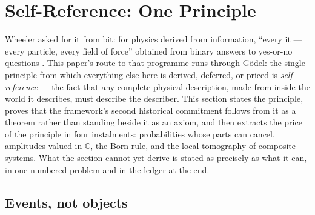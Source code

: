 %

\section{Self-Reference: One Principle}
\label{sec:self-reference-2}

Wheeler asked for it from bit: for physics derived from information, ``every it --- every particle,
every field of force'' obtained from binary answers to yes-or-no questions \autocite{Wheeler1990}.
This paper's route to that programme runs through G\"{o}del: the single principle from which
everything else here is derived, deferred, or priced is \emph{self-reference} --- the fact that any
complete physical description, made from inside the world it describes, must describe the describer.
This section states the principle, proves that the framework's second historical commitment follows
from it as a theorem rather than standing beside it as an axiom, and then extracts the price of the
principle in four instalments: probabilities whose parts can cancel, amplitudes valued in
$\mathbb{C}$, the Born rule, and the local tomography of composite systems. What the section cannot
yet derive is stated as precisely as what it can, in one numbered problem and in the ledger at the
end.

\subsection{Events, not objects}

